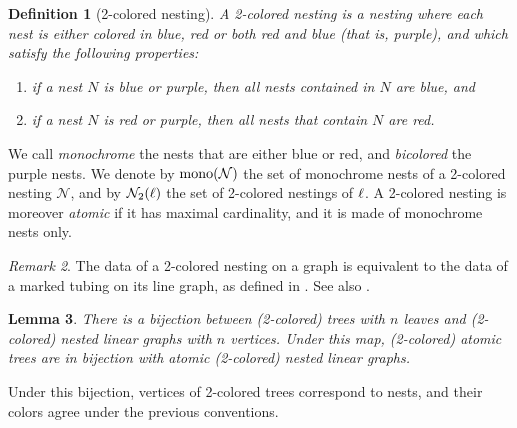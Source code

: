\documentclass[10pt]{amsart}
\newtheorem{definition}{Definition}[section]
\newtheorem{lemma}[definition]{Lemma}
\theoremstyle{remark}
\newtheorem{remark}[definition]{\sc Remark}
\begin{document}
\begin{definition}[2-colored nesting] 
A \emph{2-colored nesting} is a nesting where each nest is either colored in blue, red or both red and blue (that is, purple), and which satisfy the following properties: 
\begin{enumerate}[leftmargin=*]
\item if a nest $N$ is blue or purple, then all nests contained in $N$ are blue, and 
\item if a nest $N$ is red or purple, then all nests that contain $N$ are red.
\end{enumerate}
\end{definition}
We call \emph{monochrome} the nests that are either blue or red, and \emph{bicolored} the purple nests. 
We denote by $\mathrm{mono}(\mathcal{N})$ the set of monochrome nests of a 2-colored nesting $\mathcal{N}$, and by $\mathcal{N}_2(\ell)$ the set of 2-colored nestings of $\ell$.
A 2-colored nesting is moreover \emph{atomic} if it has maximal cardinality, and it is made of monochrome nests only. 

\begin{remark} 
The data of a 2-colored nesting on a graph is equivalent to the data of a marked tubing on its line graph, as defined in \cite{DevadossForcey08}. See also \cite[Remark 2.4]{LA21}.
\end{remark}

\begin{lemma} 
\label{lemma:bijection}
There is a bijection between (2-colored) trees with $n$ leaves and (2-colored) nested linear graphs with $n$ vertices. 
Under this map, (2-colored) atomic trees are in bijection with atomic (2-colored) nested linear graphs.
\end{lemma}

\noindent Under this bijection, vertices of 2-colored trees correspond to nests, and their colors agree under the previous conventions. 
\end{document}
